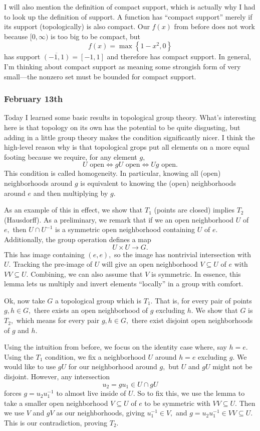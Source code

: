 I will also mention the definition of compact support, which is actually why I had to look up the definition of support. A function has ``compact support'' merely if its support (topologically) is also compact. Our $f(x)$ from before does not work because $[0,\infty)$ is too big to be compact, but
\[f(x)=\max\left\{1-x^2,0\right\}\]
has support $\overline{(-1,1)}=[-1,1]$ and therefore has compact support. In general, I'm thinking about compact support as meaning some strongish form of very small---the nonzero set must be bounded for compact support.

\subsubsection{February 13th}
Today I learned some basic results in topological group theory. What's interesting here is that topology on its own has the potential to be quite disgusting, but adding in a little group theory makes the condition significantly nicer. I think the high-level reason why is that topological grops put all elements on a more equal footing because we require, for any element $g,$
\[U\text{ open}\iff gU\text{ open}\iff Ug\text{ open}.\]
This condition is called homogeneity. In particular, knowing all (open) neighborhoods around $g$ is equivalent to knowing the (open) neighborhoods around $e$ and then multiplying by $g.$

As an example of this in effect, we show that $T_1$ (points are closed) implies $T_2$ (Hausdorff). As a preliminary, we remark that if we an open neighborhood $U$ of $e,$ then $U\cap U^{-1}$ is a symmetric open neighborhood containing $U$ of $e.$ Additionally, the group operation defines a map
\[U\times U\to G.\]
This has image containing $(e,e),$ so the image has nontrivial intersection with $U.$ Tracking the pre-image of $U$ will give an open neighborhood $V\subseteq U$ of $e$ with $VV\subseteq U.$ Combining, we can also assume that $V$ is symmetric. In essence, this lemma lets us multiply and invert elements ``locally'' in a group with comfort.

Ok, now take $G$ a topological group which is $T_1.$ That is, for every pair of points $g,h\in G,$ there exists an open neighborhood of $g$ excluding $h.$ We show that $G$ is $T_2,$ which means for every pair $g,h\in G,$ there exist disjoint open neighborhoods of $g$ and $h.$

Using the intuition from before, we focus on the identity case where, say $h=e.$ Using the $T_1$ condition, we fix a neighborhood $U$ around $h=e$ excluding $g.$ We would like to use $gU$ for our neighborhood around $g,$ but $U$ and $gU$ might not be disjoint. However, any intersection
\[u_2=gu_1\in U\cap gU\]
forces $g=u_2u_1^{-1}$ to almost live inside of $U.$ So to fix this, we use the lemma to take a smaller open neighborhood $V\subseteq U$ of $e$ to be symmetric with $VV\subseteq U.$ Then we use $V$ and $gV$ as our neighborhoods, giving $u_1^{-1}\in V,$ and $g=u_2u_1^{-1}\in VV\subseteq U.$ This is our contradiction, proving $T_2.$

